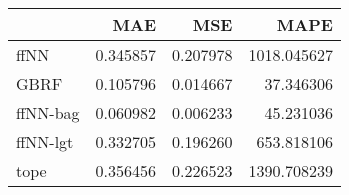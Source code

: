 \begin{tabular}{lrrr}
\toprule
{} &       MAE &       MSE &         MAPE \\
\midrule
ffNN     &  0.345857 &  0.207978 &  1018.045627 \\
GBRF     &  0.105796 &  0.014667 &    37.346306 \\
ffNN-bag &  0.060982 &  0.006233 &    45.231036 \\
ffNN-lgt &  0.332705 &  0.196260 &   653.818106 \\
tope     &  0.356456 &  0.226523 &  1390.708239 \\
\bottomrule
\end{tabular}
